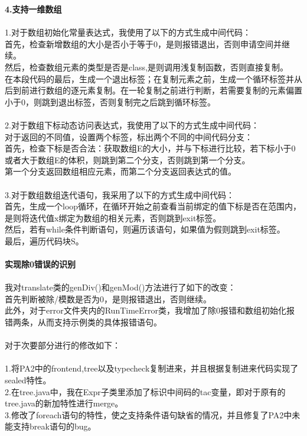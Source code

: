 \documentclass[UTF8]{ctexart}
\begin{document}
\textbf{4.支持一维数组}\\\\
1.对于数组初始化常量表达式，我使用了以下的方式生成中间代码：\\
首先，检查新增数组的大小是否小于等于0，是则报错退出，否则申请空间并继续。\\
然后，检查数组元素的类型是否是class,是则调用浅复制函数，否则直接复制。\\
在本段代码的最后，生成一个退出标签；在复制元素之前，生成一个循环标签并从后到前进行数组的逐元素复制。在一轮复制之前进行判断，若需要复制的元素偏置小于0，则跳到退出标签，否则复制完之后跳到循环标签。\\\\
2.对于数组下标动态访问表达式，我使用了以下的方式生成中间代码：\\
对于返回的不同值，设置两个标签，标出两个不同的中间代码分支：\\
首先，检查下标是否合法：获取数组E的大小，并与下标进行比较，若下标小于0或者大于数组E的体积，则跳到第二个分支，否则跳到第一个分支。\\
第一个分支返回数组相应元素，而第二个分支返回表达式的值。\\\\
3.对于数组数组迭代语句，我采用了以下的方式生成中间代码：\\
首先，生成一个loop循环，在循环开始之前查看当前绑定的值下标是否在范围内，是则将迭代值x绑定为数组的相关元素，否则跳到exit标签。\\
然后，若有while条件判断语句，则遍历该语句，如果值为假则跳到exit标签。\\
最后，遍历代码块S。\\\\
\textbf{实现除0错误的识别}\\\\
我对translate类的genDiv()和genMod()方法进行了如下的改变：\\
首先判断被除/模数是否为0，是则报错退出，否则继续。\\
此外，对于error文件夹内的RunTimeError类，我增加了除0报错和数组初始化报错两条，从而支持示例类的具体报错语句。\\\\
对于次要部分进行的修改如下：\\\\
1.将PA2中的frontend,tree以及typecheck复制进来，并且根据复制进来代码实现了sealed特性。\\
2.在tree.java中，我在Expr子类里添加了标识中间码的tac变量，即对于原有的tree.java的新加特性进行merge。\\
3.修改了foreach语句的特性，使之支持条件语句缺省的情况，并且修复了PA2中未能支持break语句的bug。\\
\end{document}

